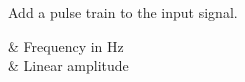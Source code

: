 Add a pulse train to the input signal.

\begin{tscattributes}
 & Frequency in Hz\\
 & Linear amplitude\\
\end{tscattributes}
